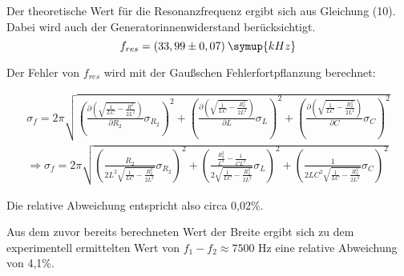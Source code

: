 Der theoretische Wert für die Resonanzfrequenz ergibt sich aus Gleichung (10).
Dabei wird auch der Generatorinnenwiderstand berücksichtigt.
\begin{equation*}
  f_{res} = (33,99 \pm 0,07) \:\symup{kHz}
\end{equation*}

Der Fehler von $f_{res}$ wird mit der Gaußschen Fehlerfortpflanzung berechnet:

\begin{align*}
  \sigma_f = 2\pi \sqrt{
  \left( \frac{\partial \left(\sqrt{\frac{1}{LC} - \frac{R^2}{2L^2}}\right)}{\partial R_2} \sigma_{R_2} \right)^{\!\! 2} +
  \left( \frac{\partial \left(\sqrt{\frac{1}{LC} - \frac{R_2^2}{2L^2}}\right)}{\partial L} \sigma_{L} \right)^{\!\! 2} +
  \left( \frac{\partial \left(\sqrt{\frac{1}{LC} - \frac{R_2^2}{2L^2}}\right)}{\partial C} \sigma_{C} \right)^{\!\! 2}
      } \\
    \Rightarrow  \sigma_f = 2 \pi \sqrt{\left(\frac{R_2}{2L^2 \sqrt{\frac{1}{LC} - \frac{R_2^2}{2L^2}}} \sigma_{R_2} \right)^2 +
  \left(\frac{\frac{R_2^2}{L^3}-\frac{1}{CL^2}}{2\sqrt{\frac{1}{LC} - \frac{R_2^2}{2L^2}}} \sigma_L \right)^2 +
  \left(\frac{1}{2LC^2  \sqrt{\frac{1}{LC} - \frac{R_2^2}{2L^2}}} \sigma_C \right)^2}
\end{align*}

Die relative Abweichung entspricht also circa 0,02\%.

Aus dem zuvor bereits berechneten Wert der Breite ergibt sich zu dem experimentell
ermittelten Wert von $f_1 - f_2 \approx 7500$ Hz eine relative Abweichung von 4,1\%.




